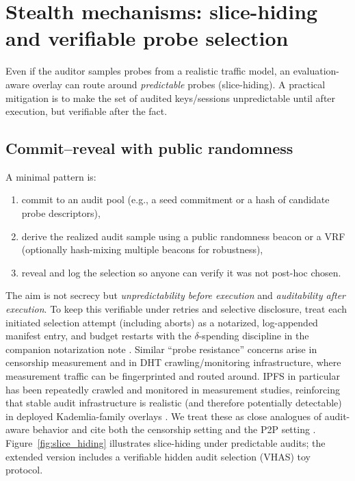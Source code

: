 \documentclass[11pt]{article}
\begin{document}
\section{Stealth mechanisms: slice-hiding and verifiable probe selection}
Even if the auditor samples probes from a realistic traffic model, an evaluation-aware overlay can route around \emph{predictable} probes (slice-hiding).
A practical mitigation is to make the set of audited keys/sessions unpredictable until after execution, but verifiable after the fact.

\subsection{Commit--reveal with public randomness}
A minimal pattern is:
\begin{enumerate}
\item commit to an audit pool (e.g., a seed commitment or a hash of candidate probe descriptors),
\item derive the realized audit sample using a public randomness beacon \cite{drand_spec,cloudflare_randomness_beacon_2025,nist_beacon,nist_ir8213_2019} or a VRF \cite{micali1999vrf} (optionally hash-mixing multiple beacons for robustness),
\item reveal and log the selection so anyone can verify it was not post-hoc chosen.
\end{enumerate}
The aim is not secrecy but \emph{unpredictability before execution} and \emph{auditability after execution}.
To keep this verifiable under retries and selective disclosure, treat each initiated selection attempt (including aborts) as a notarized, log-appended manifest entry, and budget restarts with the $\delta$-spending discipline in the companion notarization note \cite{series:evalnotary}.
Similar ``probe resistance'' concerns arise in censorship measurement and in DHT crawling/monitoring infrastructure, where measurement traffic can be fingerprinted and routed around.
IPFS in particular has been repeatedly crawled and monitored in measurement studies, reinforcing that stable audit infrastructure is realistic (and therefore potentially detectable) in deployed Kademlia-family overlays \cite{henningsen2020mapping_ipfs,daniel2022ipfs_churn}.
We treat these as close analogues of audit-aware behavior and cite both the censorship setting and the P2P setting \cite{ensafi2015gfw,deresistor2023,steiner2007kad,wolchok2010dhtcrawl}.
Figure~\ref{fig:slice_hiding} illustrates slice-hiding under predictable audits; the extended version includes a verifiable hidden audit selection (VHAS) toy protocol.
\end{document}
